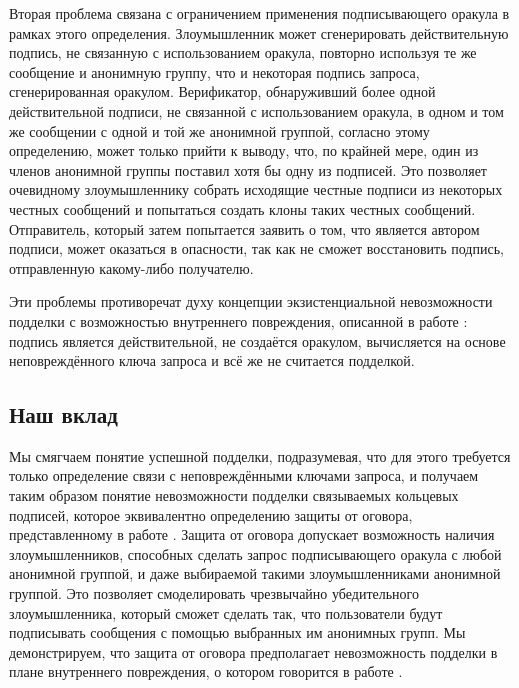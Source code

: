 \documentclass{llncs}
\begin{document}
Вторая проблема связана с ограничением применения подписывающего оракула в рамках этого определения. Злоумышленник может сгенерировать действительную подпись, не связанную с использованием оракула, повторно используя те же сообщение и анонимную группу, что и некоторая подпись запроса, сгенерированная оракулом. Верификатор, обнаруживший более одной действительной подписи, не связанной с использованием оракула, в одном и том же сообщении с одной и той же анонимной группой, согласно этому определению, может только прийти к выводу, что, по крайней мере, один из членов анонимной группы поставил хотя бы одну из подписей. Это позволяет очевидному злоумышленнику собрать исходящие честные подписи из некоторых честных сообщений и попытаться создать клоны таких честных сообщений. Отправитель, который затем попытается заявить о том, что является автором подписи, может оказаться в опасности, так как не сможет восстановить подпись, отправленную какому-либо получателю.

Эти проблемы противоречат духу концепции экзистенциальной невозможности подделки с возможностью внутреннего повреждения, описанной в работе \cite{bender2006ring}: подпись является действительной, не создаётся оракулом, вычисляется на основе неповреждённого ключа запроса и всё же не считается подделкой.


\subsection{Наш вклад}

Мы смягчаем понятие успешной подделки, подразумевая, что для этого требуется только определение связи с неповреждёнными ключами запроса, и получаем таким образом понятие невозможности подделки связываемых кольцевых подписей, которое эквивалентно определению защиты от оговора, представленному в работе \cite{au2006short}. Защита от оговора допускает возможность наличия злоумышленников, способных сделать запрос подписывающего оракула с любой анонимной группой, и даже выбираемой такими злоумышленниками анонимной группой. Это позволяет смоделировать чрезвычайно убедительного злоумышленника, который сможет сделать так, что пользователи будут подписывать сообщения с помощью выбранных им анонимных групп. Мы демонстрируем, что защита от оговора предполагает невозможность подделки в плане внутреннего повреждения, о котором говорится в работе \cite{bender2006ring}.
\end{document}

